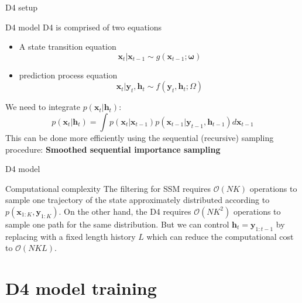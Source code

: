 \documentclass{beamer}
\begin{document}
\begin{frame}{D4 setup}
    \begin{block}{D4 model}
        D4 is comprised of two equations
        \begin{itemize}
            \item A state transition equation
            \begin{equation}\label{state_trans}
                \boldsymbol{x}_{t} | \boldsymbol{x}_{t-1} \sim g(\boldsymbol{x}_{t-1};\boldsymbol{\omega})
            \end{equation}
            \item  prediction process equation
            \begin{equation}\label{pred_proc}
                \boldsymbol{x}_{t}| \boldsymbol{y}_{t}, \boldsymbol{h}_{t} \sim f(\boldsymbol{y}_{t}, \boldsymbol{h}_{t}; \Omega)
            \end{equation}
        \end{itemize}
        We need to integrate $p(\boldsymbol{x}_{t}| \boldsymbol{h}_{t})$:
        $$p(\boldsymbol{x}_{t}| \boldsymbol{h}_{t}) = \int p(\boldsymbol{x}_{t}| \boldsymbol{x}_{t-1})p(\boldsymbol{x}_{t-1}| \boldsymbol{y}_{t-1}, \boldsymbol{h}_{t-1})d\boldsymbol{x}_{t-1}$$
        This can be done more efficiently using the sequential (recursive) sampling procedure: \textbf{Smoothed sequential importance sampling}
    \end{block}
\end{frame}

\begin{frame}{D4 model}
    \begin{block}{Computational complexity}
        The filtering for SSM requires $\mathcal{O}(NK)$ operations to sample one trajectory of the state approximately distributed according to $p(\boldsymbol{x}_{1:K}, \boldsymbol{y}_{1:K})$. On the other hand, the D4 requires $\mathcal{O}(NK^2)$ operations to sample one path for the same distribution. But we can control $\boldsymbol{h}_t = \boldsymbol{y}_{1:t-1}$ by replacing with a fixed length history $L$ which can reduce the computational cost to $\mathcal{O}(NKL)$.
    \end{block}
\end{frame}

\section{D4 model training}
\end{document}
